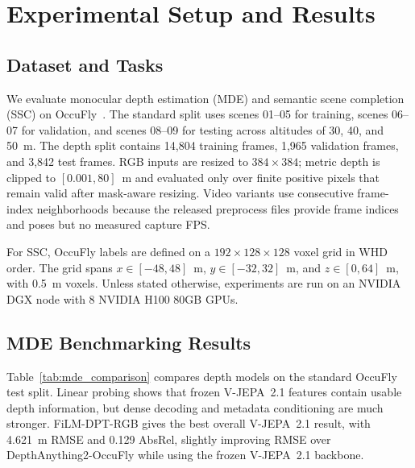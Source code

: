 \section{Experimental Setup and Results}

\subsection{Dataset and Tasks}
We evaluate monocular depth estimation (MDE) and semantic scene completion (SSC) on OccuFly~\cite{gross2026occufly}. The standard split uses scenes 01--05 for training, scenes 06--07 for validation, and scenes 08--09 for testing across altitudes of 30, 40, and 50~m. The depth split contains 14,804 training frames, 1,965 validation frames, and 3,842 test frames. RGB inputs are resized to $384\times384$; metric depth is clipped to $[0.001,80]$~m and evaluated only over finite positive pixels that remain valid after mask-aware resizing. Video variants use consecutive frame-index neighborhoods because the released preprocess files provide frame indices and poses but no measured capture FPS.

For SSC, OccuFly labels are defined on a $192\times128\times128$ voxel grid in WHD order. The grid spans $x\in[-48,48]$~m, $y\in[-32,32]$~m, and $z\in[0,64]$~m, with 0.5~m voxels. Unless stated otherwise, experiments are run on an NVIDIA DGX node with 8 NVIDIA H100 80GB GPUs.

\subsection{MDE Benchmarking Results}

Table~\ref{tab:mde_comparison} compares depth models on the standard OccuFly test split. Linear probing shows that frozen V-JEPA~2.1 features contain usable depth information, but dense decoding and metadata conditioning are much stronger. FiLM-DPT-RGB gives the best overall V-JEPA~2.1 result, with 4.621~m RMSE and 0.129 AbsRel, slightly improving RMSE over DepthAnything2-OccuFly while using the frozen V-JEPA~2.1 backbone.

